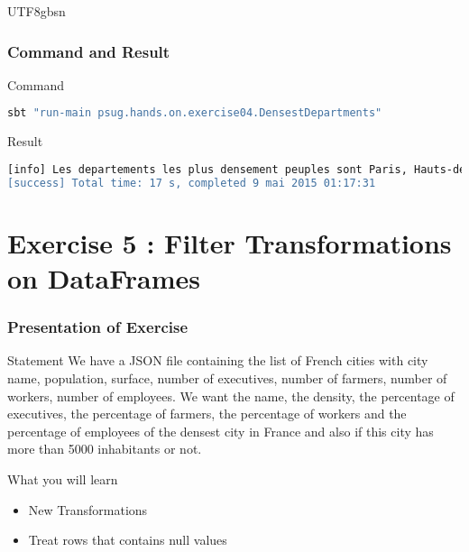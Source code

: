 \documentclass[slidetop,9pt,utf8]{beamer}
\begin{document}
\begin{CJK}{UTF8}{gbsn}
\begin{frame}
\end{frame}

\begin{frame}[fragile]
  \frametitle{Command and Result}

  \begin{block}{Command}
    \begin{lstlisting}[language=bash, style=terminal]
sbt "run-main psug.hands.on.exercise04.DensestDepartments"
    \end{lstlisting}
  \end{block}

  \begin{block}{Result}
    \begin{lstlisting}[language=bash, style=terminal]
[info] Les departements les plus densement peuples sont Paris, Hauts-de-Seine, Seine-Saint-Denis, Val-de-Marne, Val-d'Oise, Essonne, Yvelines, Rhone, Nord, Bouches-du-Rhone
[success] Total time: 17 s, completed 9 mai 2015 01:17:31
    \end{lstlisting}
  \end{block}

\end{frame}

\section{Exercise 5 : Filter Transformations on DataFrames}

\begin{frame}
  \frametitle{Presentation of Exercise}

  \begin{block}{Statement}
    We have a JSON file containing the list of French cities with city name, population, surface, number of executives, number of farmers, number of workers, number of employees. We want the name, the density, the percentage of executives, the percentage of farmers, the percentage of workers and the percentage of employees of the densest city in France and also if this city has more than 5000 inhabitants or not.
  \end{block}

  \begin{block}{What you will learn}
    \begin{itemize}
      \item New Transformations
      \item Treat rows that contains null values
    \end{itemize}
  \end{block}


\end{frame}
\end{CJK}
\end{document}
